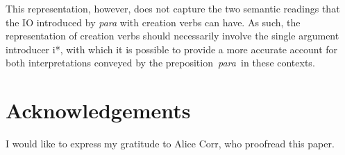 \documentclass[output=paper,colorlinks,citecolor=brown,nonflat]{./langscibook}
\begin{document}
This representation, however, does not capture the two semantic readings that the IO introduced by \textit{para} with creation verbs can have. As such, the representation of creation verbs should necessarily involve the single argument introducer i*, with which it is possible to provide a more accurate account for both interpretations conveyed by the preposition~\textit{para~}in these contexts.

\section*{Acknowledgements}
I would like to express my gratitude to Alice Corr, who proofread this paper.

\sloppy\printbibliography[heading=subbibliography,notkeyword=this]
\end{document}
